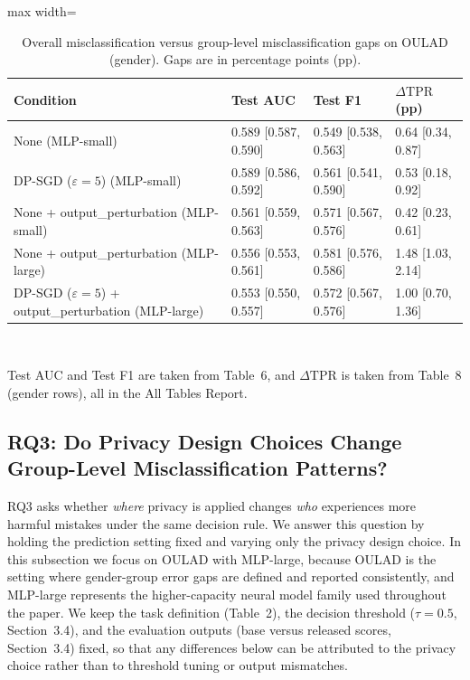 \documentclass{edm_article}
\begin{document}
\begin{table}[t]
\centering
\caption{Overall misclassification versus group-level misclassification gaps on OULAD (gender). Gaps are in percentage points (pp).}
\label{tab:rq2_overall_vs_group}
\begin{threeparttable}
\begin{adjustbox}{max width=\linewidth}
\begin{tabular}{@{}l l l l@{}}
\toprule
Condition & Test AUC & Test F1 & $\Delta\mathrm{TPR}$ (pp) \\
\midrule
None (MLP-small) &
0.589 [0.587, 0.590] &
0.549 [0.538, 0.563] &
0.64 [0.34, 0.87] \\
DP-SGD ($\varepsilon=5$) (MLP-small) &
0.589 [0.586, 0.592] &
0.561 [0.541, 0.590] &
0.53 [0.18, 0.92] \\
None + output\_perturbation (MLP-small) &
0.561 [0.559, 0.563] &
0.571 [0.567, 0.576] &
0.42 [0.23, 0.61] \\
None + output\_perturbation (MLP-large) &
0.556 [0.553, 0.561] &
0.581 [0.576, 0.586] &
1.48 [1.03, 2.14] \\
DP-SGD ($\varepsilon=5$) + output\_perturbation (MLP-large) &
0.553 [0.550, 0.557] &
0.572 [0.567, 0.576] &
1.00 [0.70, 1.36] \\
\bottomrule
\end{tabular}
\end{adjustbox}
\\
\begin{flushleft}
\justifying 
\footnotesize
\item Test AUC and Test F1 are taken from Table~6, and $\Delta\mathrm{TPR}$ is taken from Table~8 (gender rows), all in the All Tables Report.
\end{flushleft}
\end{threeparttable}
\end{table}

\subsection{RQ3: Do Privacy Design Choices Change Group-Level Misclassification Patterns?}

RQ3 asks whether \emph{where} privacy is applied changes \emph{who} experiences more harmful mistakes under the same decision rule. We answer this question by holding the prediction setting fixed and varying only the privacy design choice. In this subsection we focus on OULAD with MLP-large, because OULAD is the setting where gender-group error gaps are defined and reported consistently, and MLP-large represents the higher-capacity neural model family used throughout the paper. We keep the task definition (Table~2), the decision threshold ($\tau{=}0.5$, Section~3.4), and the evaluation outputs (base versus released scores, Section~3.4) fixed, so that any differences below can be attributed to the privacy choice rather than to threshold tuning or output mismatches.
\end{document}
